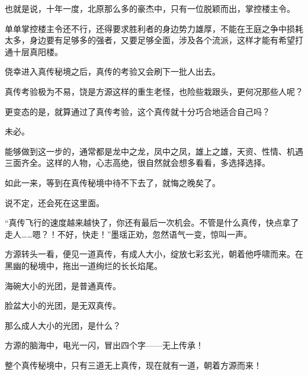 \begin{this_body}
也就是说，十年一度，北原那么多的豪杰中，只有一位脱颖而出，掌控楼主令。

单单掌控楼主令还不行，还得要求胜利者的身边势力雄厚，不能在王庭之争中损耗太多，身边要有足够多的强者，又要足够全面，涉及各个流派，这样才能有希望打通十层真阳楼。

侥幸进入真传秘境之后，真传的考验又会刷下一批人出去。

真传考验极为不易，饶是方源这样的重生老怪，也险些栽跟头，更何况那些人呢？

更变态的是，就算通过了真传考验，这个真传就十分巧合地适合自己吗？

未必。

能够做到这一步的，通常都是龙中之龙，凤中之凤，雄上之雄，天资、性情、机遇三面齐全。这样的人物，心志高绝，很自然就会想多看看，多选择选择。

如此一来，等到在真传秘境中待不下去了，就悔之晚矣了。

说不定，还会死在这里面。

“真传飞行的速度越来越快了，你还有最后一次机会。不管是什么真传，快点拿了走人……嗯？！不好，快走！”墨瑶正劝，忽然语气一变，惊叫一声。

方源转头一看，便见一道真传，有成人大小，绽放七彩玄光，朝着他呼啸而来。在黑幽的秘境中，拖出一道绚烂的长长焰尾。

海碗大小的光团，是普通真传。

脸盆大小的光团，是无双真传。

那么成人大小的光团，是什么？

方源的脑海中，电光一闪，冒出四个字——无上传承！

整个真传秘境中，只有三道无上真传，现在就有一道，朝着方源而来！

\end{this_body}

